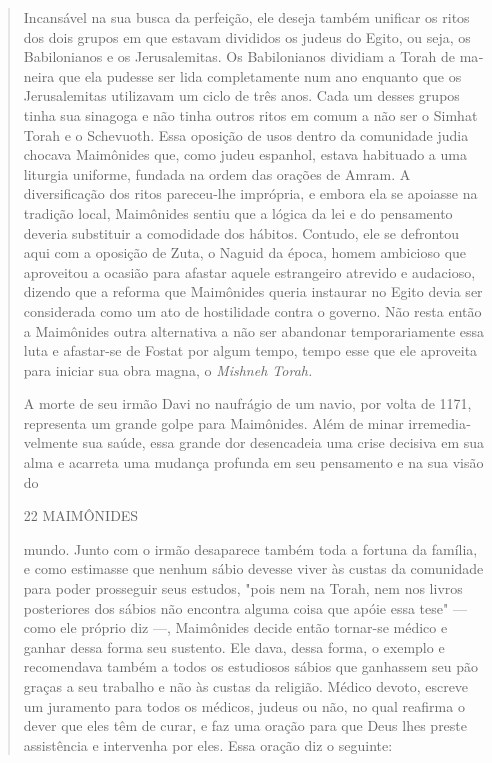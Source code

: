 \begin{quote}
Incansável na sua busca da perfeição, ele deseja também unificar os
ritos dos dois grupos em que estavam divididos os judeus do Egito, ou
seja, os Babilonianos e os Jerusalemitas. Os Babilonianos dividiam a
Torah de ma­neira que ela pudesse ser lida completamente num ano
enquanto que os Jerusa­lemitas utilizavam um ciclo de três anos. Cada um
desses grupos tinha sua sina­goga e não tinha outros ritos em comum a
não ser o Simhat Torah e o Sche­vuoth. Essa oposição de usos dentro da
comunidade judia chocava Maimôni­des que, como judeu espanhol, estava
habituado a uma liturgia uniforme, fun­dada na ordem das orações de
Amram. A diversificação dos ritos pareceu-lhe imprópria, e embora ela se
apoiasse na tradição local, Maimônides sentiu que a lógica da lei e do
pensamento deveria substituir a comodidade dos hábitos. Contudo, ele se
defrontou aqui com a oposição de Zuta, o Naguid da época, homem
ambicioso que aproveitou a ocasião para afastar aquele estrangeiro
atre­vido e audacioso, dizendo que a reforma que Maimônides queria
instaurar no Egito devia ser considerada como um ato de hostilidade
contra o governo. Não resta então a Maimônides outra alternativa a não
ser abandonar temporariamente essa luta e afastar-se de Fostat por algum
tempo, tempo esse que ele aproveita para iniciar sua obra magna, o
\emph{Mishneh Torah.}

A morte de seu irmão Davi no naufrágio de um navio, por volta de 1171,
representa um grande golpe para Maimônides. Além de minar
irremedia­velmente sua saúde, essa grande dor desencadeia uma crise
decisiva em sua al­ma e acarreta uma mudança profunda em seu pensamento
e na sua visão do

22 MAIMÔNIDES

mundo. Junto com o irmão desaparece também toda a fortuna da família, e
co­mo estimasse que nenhum sábio devesse viver às custas da comunidade
para poder prosseguir seus estudos, "pois nem na Torah, nem nos livros
posterio­res dos sábios não encontra alguma coisa que apóie essa tese"
--- como ele pró­prio diz ---, Maimônides decide então tornar-se médico
e ganhar dessa forma seu sustento. Ele dava, dessa forma, o exemplo e
recomendava também a to­dos os estudiosos sábios que ganhassem seu pão
graças a seu trabalho e não às custas da religião. Médico devoto,
escreve um juramento para todos os mé­dicos, judeus ou não, no qual
reafirma o dever que eles têm de curar, e faz uma oração para que Deus
lhes preste assistência e intervenha por eles. Essa oração diz o
seguinte:


\end{quote}
